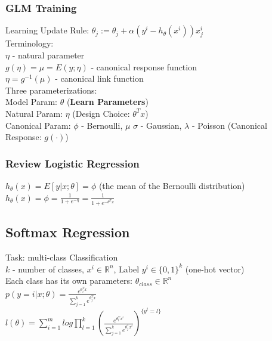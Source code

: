 \documentclass{article}
\begin{document}
\subsubsection{GLM Training}
Learning Update Rule:
  $\theta_j := \theta_j + \alpha(y^i-h_\theta(x^i))x_j^i$\\

\noindent
Terminology:\\
$\eta$ - natural parameter\\
$g(\eta) = \mu = E(y;\eta)$ - canonical response function\\
$\eta = g^{-1}(\mu)$ - canonical link function\\

\noindent
Three parameterizations:\\
Model Param: $\theta$ (\textbf{Learn Parameters})\\
Natural Param: $\eta$ (Design Choice: $\theta^Tx$)\\
Canonical Param: $\phi$ - Bernoulli, $\mu$ $\sigma$ - Gaussian, $\lambda$ - Poisson (Canonical Response: $g(\cdot)$)\\

\subsubsection{Review Logistic Regression}
$h_\theta(x) = E[y|x;\theta] = \phi$ (the mean of the Bernoulli distribution)\\
$h_\theta(x) = \phi = \frac{1}{1+e^{-\eta}} = \frac{1}{1+e^{-\theta^Tx}}$

\subsection{Softmax Regression}
Task: multi-class Classification\\
$k$ - number of classes, $x^i \in \mathbb{R}^n$, Label $y^i \in \{0,1\}^k$ (one-hot vector)\\
Each class has its own parameters: $\theta_{class} \in \mathbb{R}^n$\\
$p(y=i|x;\theta) = \frac{e^{\theta_i^Tx}}{\sum_{j=1}^ke^{\theta_j^Tx}}$\\
$l(\theta) = \sum\limits_{i=1}^mlog\prod\limits_{l=1}^k(\frac{e^{\theta_l^Tx^i}}{\sum_{j=1}^ke^{\theta_j^Tx^i}})^{\{y^i = l\}}$
\end{document}
